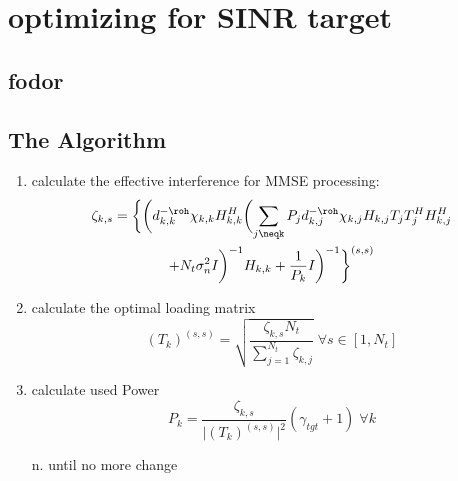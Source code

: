 \section{optimizing for SINR target}
\subsection{fodor}

\subsection{The Algorithm}
\begin{enumerate}
	\item calculate the effective interference for MMSE processing:
		\begin{multline}
			\zeta_{k,s} = \biggl\{\biggl(d^{-\roh}_{k,k}\chi_{k,k}H^H_{k,k}\biggl(\sum_{j\neqk}{P_jd^{-\roh}_{k,j}\chi_{k,j}H_{k,j}T_jT_j^HH^H_{k,j}}\\
			+N_t\sigma^2_nI\biggr)^{-1}H_{k,k}+\frac{1}{P_k}I\biggr)^{-1}\biggr\}^{(s,s)}
		\end{multline}

	\item calculate the optimal loading matrix
		\begin{equation}
			(T_k)^{(s,s)} = \sqrt{\frac{\zeta_{k,s}N_t}{\sum_{j=1}^{N_t}\zeta_{k,j}}}\;\forall s\in[1,N_t]
		\end{equation}

	\item calculate used Power
		\begin{equation}
			P_k = \frac{\zeta_{k,s}}{\vert(T_k)^{(s,s)}\vert^2}(\gamma_{tgt}+1)\;\forall k
		\end{equation}

	\item[n.] until no more change

\end{enumerate}

